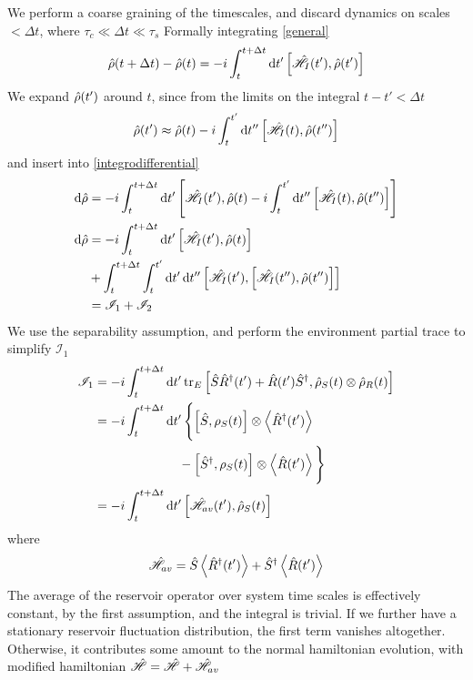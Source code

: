 We perform a coarse graining of the timescales, and discard dynamics on scales $<\Delta t$, where $\tau_c \ll \Delta t \ll \tau_s$
Formally integrating \cref{general}
\begin{equation}
  \dens(t+\Delta t) - \dens(t) = -i \int_t^{t+\Delta t} \dd{t'} \comm{\ham_{I}(t')}{\dens(t')}
  \label{integrodifferential}
\end{equation}
We expand $\hat{\rho}(t')$ around $t$, since from the limits on the integral $t-t'<\Delta t$
\begin{equation}
  \dens(t') \approx \dens(t) - i\int^{t'}_t\dd{t''}\comm{\ham_I(t)}{\dens(t'')}
\end{equation}
and insert into \cref{integrodifferential}
\begin{align*}
  \dd{\dens} &= -i\int_t^{t+\Delta t} \dd{t'} \comm{\ham_I(t')}{\dens(t) - i\int^{t'}_t\dd{t''}\comm{\ham_I(t)}{\dens(t'')}}\\
  \dd{\dens} &= -i\int_t^{t+\Delta t} \dd{t'} \comm{\ham_I(t')}{\dens(t)}\\
             &+   \int_t^{t+\Delta t} \int_t^{t'} \dd{t'}\dd{t''} \comm{\ham_I(t')}{\comm{\ham_I(t'')}{\dens(t'')}}\\
             &= \mathscr{I}_1 + \mathscr{I}_2
\end{align*}
We use the separability assumption, and perform the environment partial trace to simplify $\mathscr{I}_1$
\begin{align*}
  \mathscr{I}_1&= -i \int_t^{t+\Delta t} \dd{t'} \tr_E \comm{\hat{S}\hat{R}^\dagger (t')+\hat{R}(t')\hat{S}^\dagger}{\dens_S(t) \otimes \dens_R(t)}\\
               &= -i \int_t^{t+\Delta t} \dd{t'} \Bigg\{\comm{\hat{S}}{\rho_S(t)} \otimes \ev{\hat{R}^\dagger (t')} \\
               &\qquad \qquad \qquad \ \ - \comm{\hat{S}^\dagger}{\rho_S(t)} \otimes \ev{\hat{R}(t')}\Bigg\}\\
               &=-i \int^{t+\Delta t}_t \dd{t'} \comm{\ham_{av}(t')}{\dens_S(t)}
\end{align*}
where
\begin{equation}
  \ham_{av} = \hat{S} \ev{\hat{R}^\dagger (t')} + \hat{S}^\dagger \ev{\hat{R}(t')}
\end{equation}
The average of the reservoir operator over system time scales is effectively constant, by the first assumption, and the integral is trivial. 
If we further have a stationary reservoir fluctuation distribution, the first term vanishes altogether.
Otherwise, it contributes some amount to the normal hamiltonian evolution, with modified hamiltonian $\hat{\mathscr{H}} = \hat{\mathscr{H}} + \hat{\mathscr{H}}_{av}$

